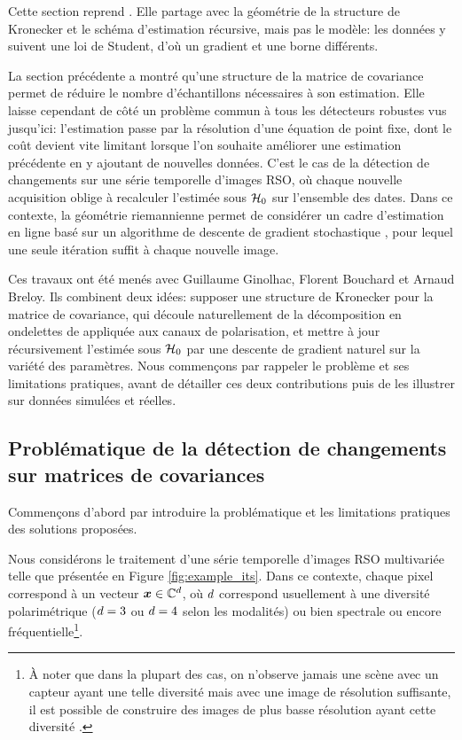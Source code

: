 \begin{contributions}
  Cette section reprend . Elle partage avec  la géométrie de la structure de Kronecker et le schéma d'estimation récursive, mais pas le modèle: les données y suivent une loi de Student, d'où un gradient et une borne différents.
\end{contributions}

La section précédente a montré qu'une structure de la matrice de covariance permet de réduire le nombre d'échantillons nécessaires à son estimation. Elle laisse cependant de côté un problème commun à tous les détecteurs robustes vus jusqu'ici: l'estimation passe par la résolution d'une équation de point fixe, dont le coût devient vite limitant lorsque l'on souhaite améliorer une estimation précédente en y ajoutant de nouvelles données. C'est le cas de la détection de changements sur une série temporelle d'images RSO, où chaque nouvelle acquisition oblige à recalculer l'estimée sous $\mathcal{H}_0$ sur l'ensemble des dates. Dans ce contexte, la géométrie riemannienne permet de considérer un cadre d'estimation en ligne basé sur un algorithme de descente de gradient stochastique \cite{Zhou_2019}, pour lequel une seule itération suffit à chaque nouvelle image.

Ces travaux ont été menés avec Guillaume Ginolhac, Florent Bouchard et Arnaud Breloy. Ils combinent deux idées: supposer une structure de Kronecker pour la matrice de covariance, qui découle naturellement de la décomposition en ondelettes de \cite{Mian_wavelet_2019} appliquée aux canaux de polarisation, et mettre à jour récursivement l'estimée sous $\mathcal{H}_0$ par une descente de gradient naturel sur la variété des paramètres. Nous commençons par rappeler le problème et ses limitations pratiques, avant de détailler ces deux contributions puis de les illustrer sur données simulées et réelles.


\subsection{Problématique de la détection de changements sur matrices de covariances}

Commençons d'abord par introduire la problématique et les limitations pratiques des solutions proposées.

Nous considérons le traitement d'une série temporelle d'images RSO multivariée telle que présentée en Figure \ref{fig:example_its}. Dans ce contexte, chaque pixel correspond à un vecteur $\boldsymbol{x}\in\mathbb{C}^d$, où $d$ correspond usuellement à une diversité polarimétrique ($d=3$ ou $d=4$ selon les modalités) ou bien spectrale ou encore fréquentielle\footnote{\`A noter que dans la plupart des cas, on n'observe jamais une scène avec un capteur ayant une telle diversité mais avec une image de résolution suffisante, il est possible de construire des images de plus basse résolution ayant cette diversité \cite{Mian_wavelet_2019}.}.


